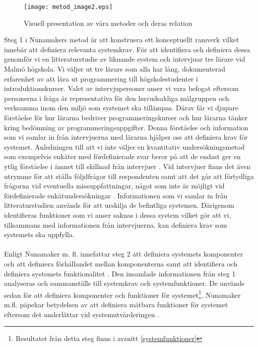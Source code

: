 \documentclass[a4paper,11pt]{article}
\begin{document}
{\begin{figure}[ht!]
\centering
\texttt{[image: metod\_image2.eps]}
\caption{Visuell presentation av våra metoder och deras relation}
\label{fig:metod_visual}
\end{figure}

Steg 1 i Nunamakers metod  är att konstruera ett konceptuellt ramverk vilket innebär att definiera relevanta systemkrav. För att identifiera och definiera dessa genomför vi en litteraturstudie av liknande system och intervjuar tre lärare vid Malmö högskola. Vi väljer ut tre lärare som alla har lång, dokumenterad erfarenhet av att lära ut programmering till högskolestudenter i introduktionskurser. Valet av intervjupersoner anser vi vara befogat eftersom personerna i fråga är representativa för den huvudsakliga målgruppen och verksamma inom den miljö som systemet ska tillämpas. Därav får vi djupare förståelse för hur lärarna bedriver programmeringskurser och hur lärarna tänker kring bedömning av programmeringsuppgifter. Denna förståelse och information som vi samlar in från intervjuerna med lärarna hjälper oss att definiera krav för systemet.
Anledningen till att vi inte väljer en kvantitativ undersökningsmetod som exempelvis enkäter med fördefinierade svar beror på att de endast ger en ytlig förståelse i ämnet till skillnad från intervjuer \cite{seminarieboken}. Vid intervjuer finns det även utrymme för att ställa följdfrågor till respondenten samt att det går att förtydliga frågorna vid eventuella missuppfattningar, något som inte är möjligt vid fördefinierade enkätundersökningar \cite{seminarieboken}. Informationen som vi samlar in från litteraturstudien används för att urskilja de befintliga systemen. Därigenom identifieras funktioner som vi anser saknas i dessa system vilket gör att vi, tillsammans med informationen från intervjuerna, kan definiera krav som systemets ska uppfylla.
\\
\\
Enligt Nunamaker m. fl. innefattar steg 2 att definiera systemets komponenter och att definiera förhållandet mellan komponenterna samt att identifiera och definiera systemets funktionalitet \cite{nunamaker}. Den insamlade informationen från steg 1 analyseras och sammanställs till systemkrav och systemfunktioner. De används sedan för att definiera komponenter och funktioner för systemet\footnote{Resultatet från detta steg finns i avsnitt \ref{systemfunktioner}}. Nunamaker m.fl. påpekar betydelsen av att definiera mätbara funktioner för systemet eftersom det underlättar vid systemutvärderingen \cite{nunamaker}.
}
\end{document}
